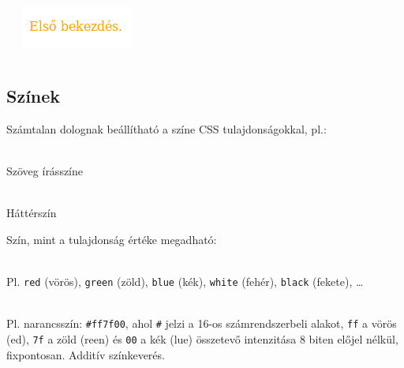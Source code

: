 \begin{frame}
  \begin{exampleblock}{}
    \scriptsize
    
  \end{exampleblock}
  \begin{columns}[T]
      \begin{exampleblock}{}
        \scriptsize
        
      \end{exampleblock}
      \includegraphics[width=.66\textwidth]{utkozes2.png}
  \end{columns} 
\end{frame}

\subsection{Színek}

\begin{frame}
  Számtalan dolognak beállítható a színe CSS tulajdonságokkal, pl.:
  \begin{description}[m]
    \item[\texttt{color}] \hfill \\ Szöveg írásszíne
    \item[\texttt{background-color}] \hfill \\ Háttérszín
  \end{description}
  Szín, mint a tulajdonság értéke megadható:
  \begin{description}[m]
    \item[kulcsszavakkal] \hfill \\ Pl. \texttt{red} (vörös), 
    \texttt{green} (zöld), \texttt{blue} (kék), \texttt{white} (fehér), 
    \texttt{black} (fekete), \dots \\
    \item[Hexadecimálisan, RGB összetevőkkel] \hfill \\ Pl. 
    narancsszín: \texttt{\#ff7f00}, ahol \texttt{\#} jelzi a 16-os 
    számrendszerbeli alakot, \texttt{ff} a vörös (ed), 
    \texttt{7f} a zöld (reen) és \texttt{00} a kék 
    (lue) összetevő intenzitása 8 biten előjel nélkül, 
    fixpontosan. Additív színkeverés.
  \end{description}
\end{frame}

